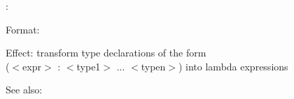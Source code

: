 \untype:

Format: 

Effect: transform type declarations of the form \\
	($<$expr$>$ : $<$type1$>$ ...  $<$typen$>$) into lambda expressions

See also: \horizon
